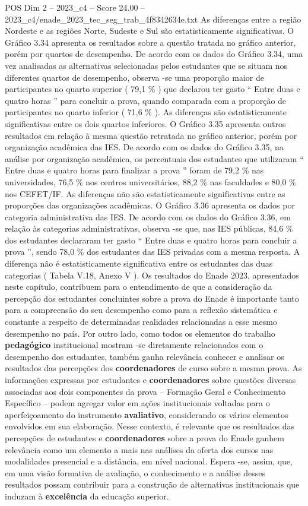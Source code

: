 \begin{textsample}{POS Dim 2 – 2023\_c4 – Score 24.00 – 2023\_c4/enade\_2023\_tec\_seg\_trab\_4f8342634e.txt}
As diferenças entre a região Nordeste e as regiões Norte, Sudeste e Sul são estatisticamente significativas.
O Gráfico 3.34 apresenta os resultados sobre a questão tratada no gráfico anterior, porém por quartos de desempenho.
De acordo com os dados do Gráfico 3.34, uma vez analisadas as alternativas selecionadas pelos estudantes que se situam nos diferentes quartos de desempenho, observa -se uma proporção maior de participantes no quarto superior ( 79,1 \% ) que declarou ter gasto “ Entre duas e quatro horas ” para concluir a prova, quando comparada com a proporção de participantes no quarto inferior ( 71,6 \% ).
As diferenças são estatisticamente significativas entre os dois quartos inferiores.
O Gráfico 3.35 apresenta outros resultados em relação à mesma questão retratada no gráfico anterior, porém por organização acadêmica das IES.
De acordo com os dados do Gráfico 3.35, na análise por organização acadêmica, os percentuais dos estudantes que utilizaram “ Entre duas e quatro horas para finalizar a prova ” foram de 79,2 \% nas universidades, 76,5 \% nos centros universitários, 88,2 \% nas faculdades e 80,0 \% nos CEFET/IF.
As diferenças não são estatisticamente significativas entre as proporções das organizações acadêmicas.
O Gráfico 3.36 apresenta os dados por categoria administrativa das IES.
De acordo com os dados do Gráfico 3.36, em relação às categorias administrativas, observa -se que, nas IES públicas, 84,6 \% dos estudantes declararam ter gasto “ Entre duas e quatro horas para concluir a prova ”, sendo 78,0 \% dos estudantes das IES privadas com a mesma resposta.
A diferença não é estatisticamente significativa entre os estudantes das duas categorias ( Tabela V.18, Anexo V ).
Os resultados do Enade 2023, apresentados neste capítulo, contribuem para o entendimento de que a consideração da percepção dos estudantes concluintes sobre a prova do Enade é importante tanto para a compreensão do seu desempenho como para a reflexão sistemática e constante a respeito de determinadas realidades relacionadas a esse mesmo desempenho no país.
Por outro lado, como todos os elementos do trabalho \textbf{pedagógico} institucional mostram -se diretamente relacionados com o desempenho dos estudantes, também ganha relevância conhecer e analisar os resultados das percepções dos \textbf{coordenadores} de curso sobre a mesma prova.
As informações expressas por estudantes e \textbf{coordenadores} sobre questões diversas associadas aos dois componentes da prova – Formação Geral e Conhecimento Específico – podem agregar valor em ações institucionais voltadas para o aperfeiçoamento do instrumento \textbf{avaliativo}, considerando os vários elementos envolvidos em sua elaboração.
Nesse contexto, é relevante que os resultados das percepções de estudantes e \textbf{coordenadores} sobre a prova do Enade ganhem relevância como um elemento a mais nas análises da oferta dos cursos nas modalidades presencial e a distância, em nível nacional.
Espera -se, assim, que, em uma visão formativa de avaliação, o conhecimento e a análise desses resultados possam contribuir para a construção de alternativas institucionais que induzam à \textbf{excelência} da educação superior.


\end{textsample}
